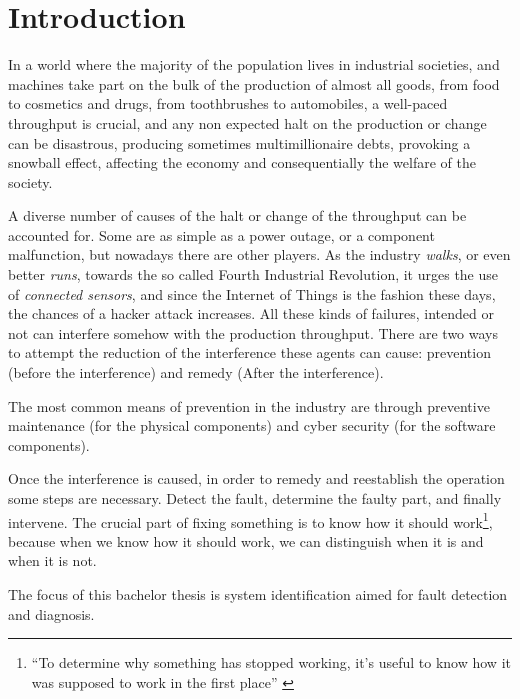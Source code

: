 
\chapter{Introduction}
In a world where the majority of the population lives in industrial societies,
and machines take part on the bulk of the production of almost all goods, from
food to cosmetics and drugs, from toothbrushes to automobiles, 
a well-paced throughput is crucial, and any non expected halt on the
production or change can be disastrous, producing sometimes multimillionaire debts,
provoking a snowball effect, affecting the economy and consequentially the welfare of the society.

A diverse number of causes of the halt or change of the throughput can be
accounted for. Some are as simple as a power outage, or a component malfunction,
but nowadays there are other players. As the industry \textsl{walks}, or even
better \textsl{runs}, towards the so called Fourth Industrial Revolution, 
it urges the use of \textit{connected sensors}, and since the Internet of
Things is the fashion these days, the chances of a hacker attack increases. All
these kinds of failures, intended or not can interfere somehow with the
production throughput. There are two ways to attempt the reduction of the interference these agents can
cause: prevention (before the interference) and remedy (After the interference).

The most common means of prevention in the industry are through preventive
maintenance (for the physical components) and cyber security (for the software
components).

Once the interference is caused, in order to remedy and reestablish
the operation some steps are necessary. Detect the fault, determine the faulty
part, and finally intervene.
The crucial part of fixing something is to know how it should
work\footnote{``To determine why something has stopped working, it's useful to
  know how it was supposed to work in the first place'' \cite{davis1988model}},
because when we know how it should work, we can distinguish when it is and when
it is not.

The focus of this bachelor thesis is system identification aimed for fault
detection and diagnosis.



